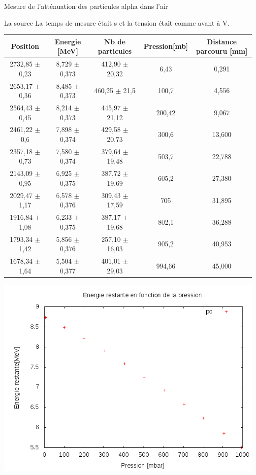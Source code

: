 \documentclass[a4paper,11pt]{scrartcl}
\begin{document}
\begin{section}{Mesure de l'atténuation des particules alpha dans l'air}
   \begin{subsection}{La source }
    La temps de mesure était \unit[30]{s} et la tension était comme avant à \unit[80]{V}.
    \begin{center}
     \begin{tabular}{c|c|c|c|c}
      Position	&Energie [MeV]	&Nb de particules	&Pression[mb]	&Distance parcouru [mm]\\ \hline
      2732,85 $\pm$ 0,23	&8,729 $\pm$ 0,373	&412,90 $\pm$ 20,32	&6,43	&0,291\\
      2653,17 $\pm$ 0,36	&8,485 $\pm$ 0,373	&460,25 $\pm$ 21,5	&100,7	&4,556\\
      2564,43 $\pm$ 0,45	&8,214 $\pm$ 0,373	&445,97 $\pm$ 21,12	&200,42	&9,067\\
      2461,22 $\pm$ 0,6	&7,898 $\pm$ 0,374	&429,58 $\pm$ 20,73	&300,6	&13,600\\
      2357,18 $\pm$ 0,73	&7,580 $\pm$ 0,374	&379,64 $\pm$ 19,48	&503,7	&22,788\\
      2143,09 $\pm$ 0,95	&6,925 $\pm$ 0,375	&387,72 $\pm$ 19,69	&605,2	&27,380\\
      2029,47 $\pm$ 1,17	&6,578 $\pm$ 0,376	&309,43 $\pm$ 17,59	&705	&31,895\\
      1916,84 $\pm$ 1,08	&6,233 $\pm$ 0,375	&387,17 $\pm$ 19,68	&802,1	&36,288\\
      1793,34 $\pm$ 1,42	&5,856 $\pm$ 0,376	&257,10 $\pm$ 16,03	&905,2	&40,953\\
      1678,34 $\pm$ 1,64	&5,504 $\pm$ 0,377	&401,01 $\pm$ 29,03	&994,66	&45,000\\
     \end{tabular}
    \end{center}
   \begin{minipage}{0.45\textwidth}
     \includegraphics[width=\textwidth]{Sabine/po_pression.png}

\end{minipage}
\end{subsection}
\end{section}
\end{document}
